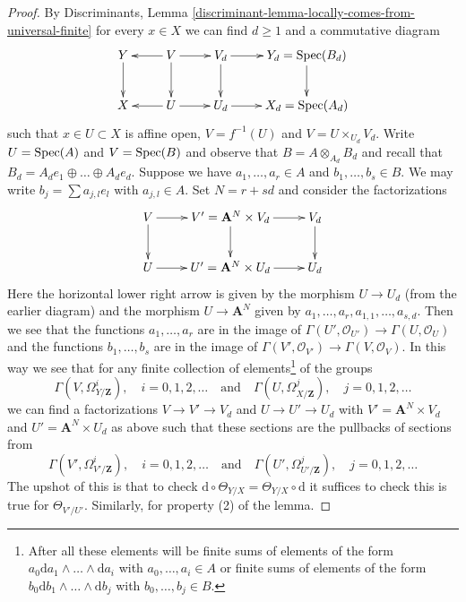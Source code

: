 \begin{proof}
By Discriminants, Lemma
\ref{discriminant-lemma-locally-comes-from-universal-finite}
for every $x \in X$ we can find $d \geq 1$ and a commutative diagram
$$
\xymatrix{
Y \ar[d] &
V \ar[d] \ar[l] \ar[r] &
V_d \ar[d] \ar[r] &
Y_d = \Spec(B_d) \ar[d] \\
X &
U \ar[l] \ar[r] &
U_d \ar[r] &
X_d = \Spec(A_d)
}
$$
such that $x \in U \subset X$ is affine open, $V = f^{-1}(U)$
and $V = U \times_{U_d} V_d$. Write $U = \mathop{\mathrm{Spec}}(A)$ and $V = \mathop{\mathrm{Spec}}(B)$
and observe that $B = A \otimes_{A_d} B_d$ and recall that
$B_d = A_d e_1 \oplus \ldots \oplus A_d e_d$. Suppose we have
$a_1, \ldots, a_r \in A$ and $b_1, \ldots, b_s \in B$.
We may write $b_j = \sum a_{j, l} e_l$ with $a_{j, l} \in A$.
Set $N = r + sd$ and consider the factorizations
$$
\xymatrix{
V \ar[r] \ar[d] &
V' = \mathbf{A}^N \times V_d \ar[r] \ar[d] &
V_d \ar[d] \\
U \ar[r]&
U' = \mathbf{A}^N \times U_d \ar[r] &
U_d
}
$$
Here the horizontal lower right arrow is given by the morphism
$U \to U_d$ (from the earlier diagram) and the morphism
$U \to \mathbf{A}^N$ given by $a_1, \ldots, a_r, a_{1, 1}, \ldots, a_{s, d}$.
Then we see that the functions $a_1, \ldots, a_r$ are in the image of
$\Gamma(U', \mathcal{O}_{U'}) \to \Gamma(U, \mathcal{O}_U)$
and the functions $b_1, \ldots, b_s$ are in the image of
$\Gamma(V', \mathcal{O}_{V'}) \to \Gamma(V, \mathcal{O}_V)$.
In this way we see that for any finite collection of elements\footnote{After
all these elements will be finite sums of elements of the form
$a_0 \text{d}a_1 \wedge \ldots \wedge \text{d}a_i$ with
$a_0, \ldots, a_i \in A$ or finite sums of elements of the form
$b_0 \text{d}b_1 \wedge \ldots \wedge \text{d}b_j$ with
$b_0, \ldots, b_j \in B$.} of the groups
$$
\Gamma(V, \Omega^i_{Y/\mathbf{Z}}),\quad i = 0, 1, 2, \ldots
\quad\text{and}\quad
\Gamma(U, \Omega^j_{X/\mathbf{Z}}),\quad j = 0, 1, 2, \ldots
$$
we can find a factorizations $V \to V' \to V_d$ and
$U \to U' \to U_d$ with $V' = \mathbf{A}^N \times V_d$ and
$U' = \mathbf{A}^N \times U_d$ as above
such that these sections are the pullbacks of sections from
$$
\Gamma(V', \Omega^i_{V'/\mathbf{Z}}),\quad i = 0, 1, 2, \ldots
\quad\text{and}\quad
\Gamma(U', \Omega^j_{U'/\mathbf{Z}}),\quad j = 0, 1, 2, \ldots
$$
The upshot of this is that to check
$\text{d} \circ \Theta_{Y/X} = \Theta_{Y/X} \circ \text{d}$
it suffices to check this is true for $\Theta_{V'/U'}$.
Similarly, for property (2) of the lemma.


\end{proof}
